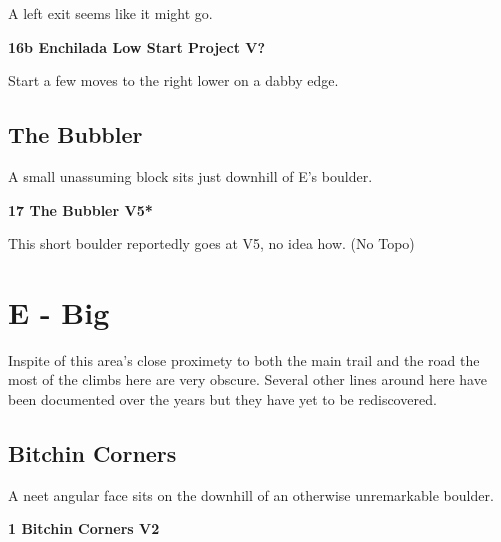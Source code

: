 \begin{multicols}{2}
\begin{adjustwidth}{0.5cm}{}
					\begin{adjustwidth}{0.5cm}{}				
					A left exit seems like it might go.
					\end{adjustwidth}
					\label{vr:Enchilada Low Start Project}
\colorbox{black!20}{
\parbox{0.95\linewidth}{
\textbf{
16b Enchilada Low Start Project V?  
}
}
}

					\begin{adjustwidth}{0.5cm}{}				
					Start a few moves to the right lower on a dabby edge.
					\end{adjustwidth}
				\end{adjustwidth}
		\subsection*{The Bubbler}\label{bf:The Bubbler}
		A small unassuming block sits just downhill of E's boulder.\\
	
			\label{rt:The Bubbler}
\colorbox{RoyalBlue!20}{
\parbox{0.95\linewidth}{
\textbf{
17 The Bubbler V5*  
}
}
}

			\begin{adjustwidth}{0.5cm}{}				
			This short boulder reportedly goes at V5, no idea how.
				\newline (No Topo) 
			\end{adjustwidth}
\newpage

		\section{E - Big}\label{sa:Big}
	Inspite of this area's close proximety to both the main trail and the road the most of the climbs here are very obscure. Several other lines around here have been documented over the years but they have yet to be rediscovered.\\

	
		\subsection*{Bitchin Corners}\label{bf:Bitchin Corners}
		A neet angular face sits on the downhill of an otherwise unremarkable boulder.\\
	

			\label{rt:Bitchin Corners}
\colorbox{green!20}{
\parbox{0.95\linewidth}{
\textbf{
1 Bitchin Corners V2  
}
}
}


\end{multicols}
